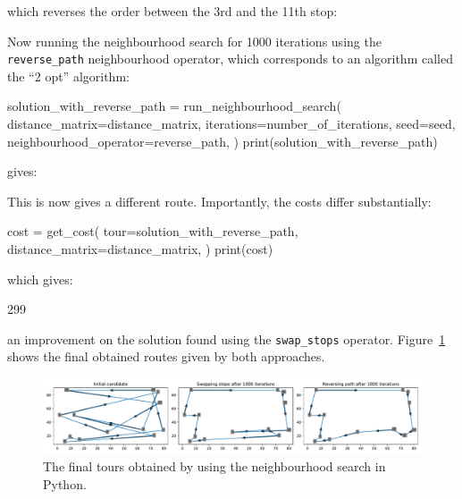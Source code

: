 which reverses the order between the 3rd and the 11th stop:

\begin{pyout}
[0, 7, 4, 10, 8, 2, 9, 3, 11, 5, 12, 1, 6, 0]
\end{pyout}

Now running the neighbourhood search for 1000 iterations using the
\texttt{reverse_path} neighbourhood operator, which corresponds to
an algorithm called the ``2 opt'' algorithm: %

\begin{pyin}
solution_with_reverse_path = run_neighbourhood_search(
    distance_matrix=distance_matrix,
    iterations=number_of_iterations,
    seed=seed,
    neighbourhood_operator=reverse_path,
)
print(solution_with_reverse_path)
\end{pyin}

gives:

\begin{pyout}
[0, 8, 5, 3, 1, 9, 12, 11, 4, 10, 6, 2, 7, 0]
\end{pyout}

This is now gives a different route.
Importantly, the costs differ substantially:

\begin{pyin}
cost = get_cost(
    tour=solution_with_reverse_path,
    distance_matrix=distance_matrix,
)
print(cost)
\end{pyin}

which gives:

\begin{pyout}
299
\end{pyout}

an improvement on the solution found using the \texttt{swap_stops}
operator. Figure~\ref{fig:final-tsp-tours-python} shows the final obtained
routes given by both approaches.

\begin{figure}
    \begin{center}
        \includegraphics[width=\textwidth]{./assets/final-tsp-tours-with-python/main.pdf}
    \end{center}
    \caption{The final tours obtained by using the neighbourhood search in
    Python.}
    \label{fig:final-tsp-tours-python}
\end{figure}



